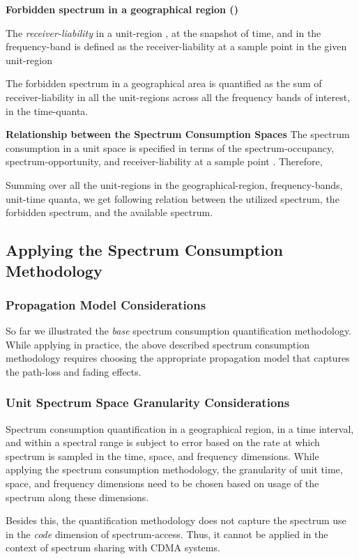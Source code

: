 \documentclass[journal,12pt,draftclsnofoot,onecolumn]{IEEEtran}
\begin{document}
\noindent
\textbf{Forbidden spectrum in a geographical region ()}

The \textit{receiver-liability} in a unit-region , at the  snapshot of time, and in the frequency-band   is defined as the receiver-liability at a sample point  in the given unit-region 

The forbidden spectrum in a geographical area is quantified as the sum of receiver-liability in all the unit-regions across all the frequency bands of interest, in the  time-quanta.


\noindent
\textbf{Relationship between the Spectrum Consumption Spaces}
The spectrum consumption in a unit space  is specified in terms of the spectrum-occupancy, spectrum-opportunity, and receiver-liability at a sample point . Therefore,

Summing over all the  unit-regions in the geographical-region,  frequency-bands,  unit-time quanta, we get following relation between the utilized spectrum, the forbidden spectrum, and the available spectrum.


\subsection{Applying the Spectrum Consumption Methodology}

\subsubsection{Propagation Model Considerations}
So far we illustrated the \textit{base} spectrum consumption quantification methodology. While applying in practice, the above described spectrum consumption methodology requires choosing the appropriate propagation model that captures the path-loss and fading effects. 
\subsubsection{Unit Spectrum Space Granularity Considerations}
Spectrum consumption quantification in a geographical region, in a time interval, and within a spectral range is subject to error based on the rate at which spectrum is sampled in the time, space, and frequency dimensions. While applying the spectrum consumption methodology, the granularity of unit time, space, and frequency dimensions need to be chosen based on usage of the spectrum along these dimensions.

Besides this, the quantification methodology does not capture the spectrum use in the \textit{code} dimension of spectrum-access. Thus, it cannot be applied in the context of spectrum sharing with CDMA systems.
\end{document}
